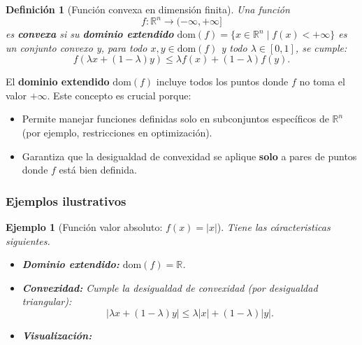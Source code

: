 \documentclass[12pt]{book}
\newtheorem{definition}{Definición}
\newtheorem{ex}{Ejemplo}
\theoremstyle{definition}
\theoremstyle{plain}
\theoremstyle{remark}
\begin{document}
\begin{definition}[Función convexa en dimensión finita]
Una función \[f: \mathbb{R}^n \to (-\infty, +\infty] \] es \textbf{convexa} si su \textbf{dominio extendido} \( \text{dom}(f) = \{x \in \mathbb{R}^n \mid f(x) < +\infty\} \) es un conjunto convexo y, para todo \( x, y \in \text{dom}(f) \) y todo \( \lambda \in [0,1] \), se cumple:
\[
f(\lambda x + (1-\lambda) y) \leq \lambda f(x) + (1-\lambda) f(y).
\]
\end{definition}

El \textbf{dominio extendido} \( \text{dom}(f) \) incluye todos los puntos donde \( f \) no toma el valor \( +\infty \). Este concepto es crucial porque:
\begin{itemize}
    \item Permite manejar funciones definidas solo en subconjuntos específicos de \( \mathbb{R}^n \) (por ejemplo, restricciones en optimización).
    \item Garantiza que la desigualdad de convexidad se aplique \textbf{solo} a pares de puntos donde \( f \) está bien definida.
\end{itemize}

\subsubsection{Ejemplos ilustrativos}

\begin{ex}[Función valor absoluto: \( f(x) = |x| \)] Tiene las c\'aracteristicas siguientes.
\begin{itemize}
    \item \textbf{Dominio extendido:} \( \text{dom}(f) = \mathbb{R} \).
    \item \textbf{Convexidad:} Cumple la desigualdad de convexidad (por desigualdad triangular):
    \[
    |\lambda x + (1-\lambda)y| \leq \lambda |x| + (1-\lambda)|y|.
    \]
    \item \textbf{Visualización:}
\end{itemize}

\begin{center}
\end{center}
\end{ex}
\end{document}
